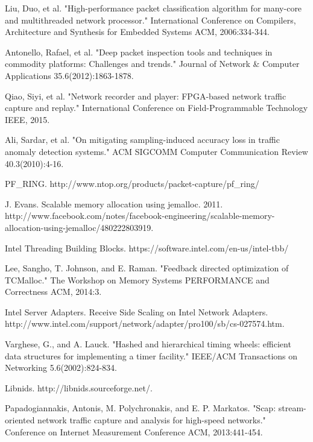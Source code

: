 \documentclass[conference]{IEEEtran}
\begin{document}
\begin{thebibliography}{1}

  Liu, Duo, et al. "High-performance packet classification algorithm for many-core and multithreaded network processor." International Conference on Compilers, Architecture and Synthesis for Embedded Systems ACM, 2006:334-344.
  
  Antonello, Rafael, et al. "Deep packet inspection tools and techniques in commodity platforms: Challenges and trends." Journal of Network \& Computer Applications 35.6(2012):1863-1878.
  
  Qiao, Siyi, et al. "Network recorder and player: FPGA-based network traffic capture and replay." International Conference on Field-Programmable Technology IEEE, 2015.
  
  Ali, Sardar, et al. "On mitigating sampling-induced accuracy loss in traffic anomaly detection systems." ACM SIGCOMM Computer Communication Review 40.3(2010):4-16.
  
  PF\_RING. http://www.ntop.org/products/packet-capture/pf\_ring/


  J. Evans. Scalable memory allocation using jemalloc. 2011. http://www.facebook.com/notes/facebook-engineering/scalable-memory-allocation-using-jemalloc/480222803919.
  
  Intel Threading Building Blocks. https://software.intel.com/en-us/intel-tbb/
  
  Lee, Sangho, T. Johnson, and E. Raman. "Feedback directed optimization of TCMalloc." The Workshop on Memory Systems PERFORMANCE and Correctness ACM, 2014:3.
  
  Intel Server Adapters. Receive Side Scaling on Intel Network Adapters. http://www.intel.com/support/network/adapter/pro100/sb/cs-027574.htm.
  
  Varghese, G., and A. Lauck. "Hashed and hierarchical timing wheels: efficient data structures for implementing a timer facility." IEEE/ACM Transactions on Networking 5.6(2002):824-834.
  
  Libnids. http://libnids.sourceforge.net/.
  
  Papadogiannakis, Antonis, M. Polychronakis, and E. P. Markatos. "Scap: stream-oriented network traffic capture and analysis for high-speed networks." Conference on Internet Measurement Conference ACM, 2013:441-454.
  

\end{thebibliography}
\end{document}
